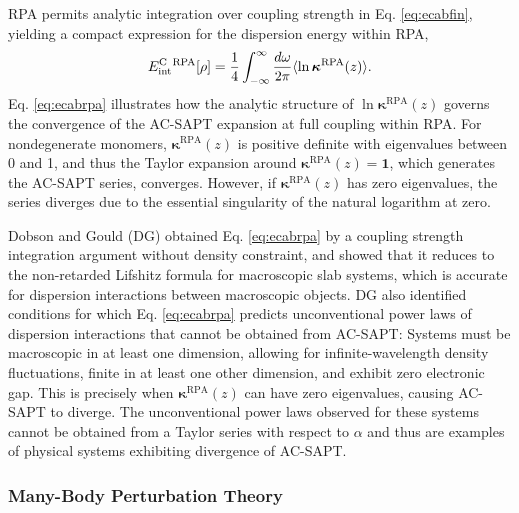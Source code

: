 \documentclass[journal=jctcce,manuscript=article]{achemso}
\begin{document}
RPA permits analytic integration over coupling strength in
Eq. \eqref{eq:ecabfin}, yielding a compact expression for the dispersion
energy within RPA,
\begin{equation}
  \label{eq:ecabrpa}
  E^{\text{C\, RPA}}_{\text{int}}[\rho] = \frac{1}{4}
  \int_{-\infty}^{\infty} \frac{d\omega}{2\pi} \langle \ln
    \boldsymbol{\kappa}^{\text{RPA}}(z) \rangle.
\end{equation}
Eq. \eqref{eq:ecabrpa} illustrates how the analytic
structure of $\ln \boldsymbol{\kappa}^{\text{RPA}}(z)$ governs the
convergence of the AC-SAPT expansion at full coupling within
RPA. For nondegenerate monomers, $\boldsymbol{\kappa}^{\text{RPA}}(z)$ is
positive definite with eigenvalues between 0 and 1, and thus the Taylor
expansion around $\boldsymbol{\kappa}^{\text{RPA}}(z) = \mathbf{1}$,
which generates the AC-SAPT series, converges. However, if
$\boldsymbol{\kappa}^{\text{RPA}}(z)$ has 
zero eigenvalues, the series diverges due to the essential
singularity of the natural logarithm at zero.

Dobson and Gould (DG) obtained Eq. \eqref{eq:ecabrpa} by a coupling strength
integration argument without density constraint, and showed that 
it reduces to the non-retarded Lifshitz formula for macroscopic slab
systems, which is accurate for dispersion interactions between macroscopic
objects.\cite{Dobson12JPhysCondensMatter24p073201} DG also identified 
conditions for which Eq. \eqref{eq:ecabrpa} predicts unconventional 
power laws of dispersion interactions that cannot be obtained from
AC-SAPT: Systems must be macroscopic in at least one dimension, allowing
for infinite-wavelength density fluctuations, finite in at least one
other dimension, and exhibit zero electronic gap. This is precisely when
$\boldsymbol{\kappa}^{\text{RPA}}(z)$ can have zero eigenvalues, causing
AC-SAPT to diverge. The unconventional power
laws observed \cite{PhysRevLett.96.073201} for these systems cannot be
obtained from a Taylor series with respect to $\alpha$ and thus are
examples of physical systems exhibiting divergence of AC-SAPT. 

\subsubsection{Many-Body Perturbation Theory}
\end{document}
